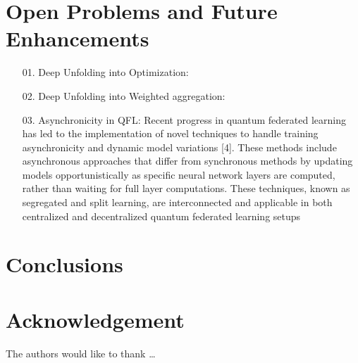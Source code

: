 \section{Open Problems and Future Enhancements}

\begin{itemize}
\item[01.] Deep Unfolding into Optimization:

\item[02.] Deep Unfolding into Weighted aggregation:

\item [03.] Asynchronicity in QFL:
Recent progress in quantum federated learning has led to the implementation of novel techniques to handle training asynchronicity and dynamic model variations [4]. These methods include asynchronous approaches that differ from synchronous methods by updating models opportunistically as specific neural network layers are computed, rather than waiting for full layer computations. These techniques, known as segregated and split learning, are interconnected and applicable in both centralized and decentralized quantum federated learning setups

\end{itemize}

\section{Conclusions} \label{sec-conclusions}


\section*{Acknowledgement}


The authors would like to thank \ldots

